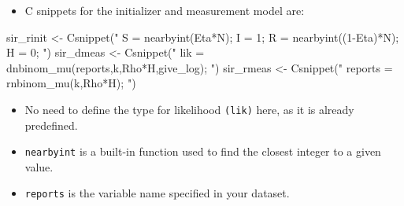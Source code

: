 \documentclass[
  ignorenonframetext,
  aspectratio=169,
  t]{beamer}
\newenvironment{Shaded}{\begin{snugshade}}{\end{snugshade}}
\newcommand{\FunctionTok}[1]{\textcolor[rgb]{0.28,0.35,0.67}{#1}}
\newcommand{\NormalTok}[1]{\textcolor[rgb]{0.00,0.23,0.31}{#1}}
\newcommand{\OtherTok}[1]{\textcolor[rgb]{0.00,0.23,0.31}{#1}}
\newcommand{\StringTok}[1]{\textcolor[rgb]{0.13,0.47,0.30}{#1}}
\providecommand{\tightlist}{%
  \setlength{\itemsep}{0pt}\setlength{\parskip}{0pt}}\usepackage{longtable,booktabs,array}
\theoremstyle{definition}
\begin{document}
\begin{frame}[fragile]
\begin{itemize}
\tightlist
\item
  C snippets for the initializer and measurement model are:
\end{itemize}

\begin{Shaded}
\begin{Highlighting}[]
\NormalTok{    sir\_rinit }\OtherTok{\textless{}{-}} \FunctionTok{Csnippet}\NormalTok{(}\StringTok{"}
\StringTok{      S = nearbyint(Eta*N);}
\StringTok{      I = 1;}
\StringTok{      R = nearbyint((1{-}Eta)*N);}
\StringTok{      H = 0;}
\StringTok{    "}\NormalTok{)}
\NormalTok{    sir\_dmeas }\OtherTok{\textless{}{-}} \FunctionTok{Csnippet}\NormalTok{(}\StringTok{"}
\StringTok{      lik = dnbinom\_mu(reports,k,Rho*H,give\_log);}
\StringTok{    "}\NormalTok{)}
\NormalTok{    sir\_rmeas }\OtherTok{\textless{}{-}} \FunctionTok{Csnippet}\NormalTok{(}\StringTok{"}
\StringTok{      reports = rnbinom\_mu(k,Rho*H);}
\StringTok{    "}\NormalTok{)}
\end{Highlighting}
\end{Shaded}

\begin{itemize}
\item
  No need to define the type for likelihood \texttt{(lik)} here, as it
  is already predefined.
\item
  \texttt{nearbyint} is a built-in function used to find the closest
  integer to a given value.
\item
  \texttt{reports} is the variable name specified in your dataset.
\end{itemize}
\end{frame}
\end{document}
